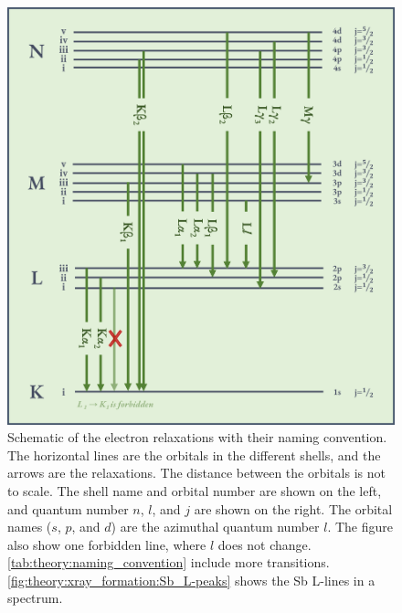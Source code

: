 \begin{figure}[p]
    \centering
    \includegraphics[width=0.95\linewidth]{figures/transition_lines.png}
    \caption{
        Schematic of the electron relaxations with their naming convention.
        The horizontal lines are the orbitals in the different shells, and the arrows are the relaxations.
        The distance between the orbitals is not to scale.
        The shell name and orbital number are shown on the left, and quantum number $n$, $l$, and $j$ are shown on the right.
        The orbital names ($s$, $p$, and $d$) are the azimuthal quantum number $l$.
        The figure also show one forbidden line, where $l$ does not change.
        \cref{tab:theory:naming_convention} include more transitions.
        \cref{fig:theory:xray_formation:Sb_L-peaks} shows the Sb L-lines in a spectrum.
    }
    \label{fig:theory:xray_formation:lines}
\end{figure}




